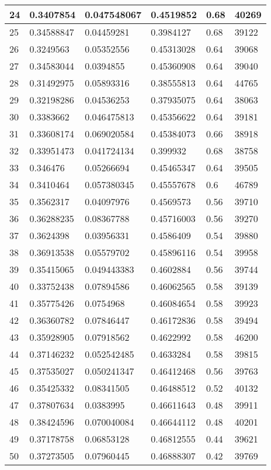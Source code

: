 \begin{longtable}{|l|l|l|l|l|l|}
24 & 0.3407854 & 0.047548067 & 0.4519852 & 0.68 & 40269 \\ \hline 
25 & 0.34588847 & 0.04459281 & 0.3984127 & 0.68 & 39122 \\ \hline 
26 & 0.3249563 & 0.05352556 & 0.45313028 & 0.64 & 39068 \\ \hline 
27 & 0.34583044 & 0.0394855 & 0.45360908 & 0.64 & 39040 \\ \hline 
28 & 0.31492975 & 0.05893316 & 0.38555813 & 0.64 & 44765 \\ \hline 
29 & 0.32198286 & 0.04536253 & 0.37935075 & 0.64 & 38063 \\ \hline 
30 & 0.3383662 & 0.046475813 & 0.45356622 & 0.64 & 39181 \\ \hline 
31 & 0.33608174 & 0.069020584 & 0.45384073 & 0.66 & 38918 \\ \hline 
32 & 0.33951473 & 0.041724134 & 0.399932 & 0.68 & 38758 \\ \hline 
33 & 0.346476 & 0.05266694 & 0.45465347 & 0.64 & 39505 \\ \hline 
34 & 0.3410464 & 0.057380345 & 0.45557678 & 0.6 & 46789 \\ \hline 
35 & 0.3562317 & 0.04097976 & 0.4569573 & 0.56 & 39710 \\ \hline 
36 & 0.36288235 & 0.08367788 & 0.45716003 & 0.56 & 39270 \\ \hline 
37 & 0.3624398 & 0.03956331 & 0.4586409 & 0.54 & 39880 \\ \hline 
38 & 0.36913538 & 0.05579702 & 0.45896116 & 0.54 & 39958 \\ \hline 
39 & 0.35415065 & 0.049443383 & 0.4602884 & 0.56 & 39744 \\ \hline 
40 & 0.33752438 & 0.07894586 & 0.46062565 & 0.58 & 39139 \\ \hline 
41 & 0.35775426 & 0.0754968 & 0.46084654 & 0.58 & 39923 \\ \hline 
42 & 0.36360782 & 0.07846447 & 0.46172836 & 0.58 & 39494 \\ \hline 
43 & 0.35928905 & 0.07918562 & 0.4622992 & 0.58 & 46200 \\ \hline 
44 & 0.37146232 & 0.052542485 & 0.4633284 & 0.58 & 39815 \\ \hline 
45 & 0.37535027 & 0.050241347 & 0.46412468 & 0.56 & 39763 \\ \hline 
46 & 0.35425332 & 0.08341505 & 0.46488512 & 0.52 & 40132 \\ \hline 
47 & 0.37807634 & 0.0383995 & 0.46611643 & 0.48 & 39911 \\ \hline 
48 & 0.38424596 & 0.070040084 & 0.46644112 & 0.48 & 40201 \\ \hline 
49 & 0.37178758 & 0.06853128 & 0.46812555 & 0.44 & 39621 \\ \hline 
50 & 0.37273505 & 0.07960445 & 0.46888307 & 0.42 & 39769 \\ \hline 
\end{longtable}